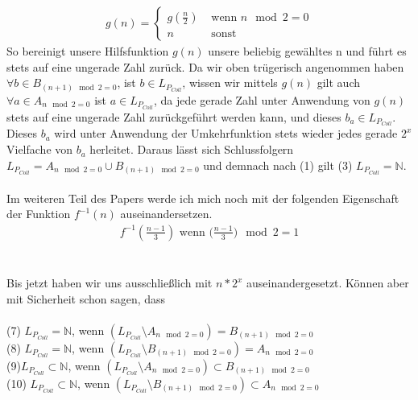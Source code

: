 \documentclass{article}
\begin{document}
\begin{gather*}
 g(n)=
\begin{cases}
g(\frac{n}{2}) & \text{ wenn } n \mod 2 = 0 \\
n & \text{ sonst }
\end{cases}  
\end{gather*}
\noindent So bereinigt unsere Hilfsfunktion $g(n)$ unsere beliebig gewähltes n und führt es stets auf eine ungerade Zahl zurück. Da wir oben trügerisch angenommen haben $\forall b \in B_{(n + 1) \mod 2 = 0}$, ist $b \in L_{P_{Coll}}$,  wissen wir mittels $g(n)$ gilt auch $\forall a \in A_{n \mod 2 = 0}$ ist $a \in L_{P_{Coll}}$, da jede gerade Zahl unter Anwendung von $g(n)$ stets auf eine ungerade Zahl zurückgeführt werden kann, und dieses $b_{a} \in L_{P_{Coll}}$. Dieses $b_{a}$ wird unter Anwendung der Umkehrfunktion stets wieder jedes gerade $2^x$ Vielfache von $b_a$ herleitet. Daraus lässt sich Schlussfolgern $L_{P_{Coll}} = A_{n \mod 2 = 0} \cup B_{(n + 1) \mod 2 = 0}$ und demnach nach (1) gilt (3) $L_{P_{Coll}} = \mathbb{N}$.\\\\
Im weiteren Teil des Papers werde ich mich noch mit der folgenden Eigenschaft der Funktion $f^{-1}(n)$ auseinandersetzen.
\begin{align*}
f^{-1}(\frac{n-1}{3}) \text{ wenn } \Big(\frac{n-1}{3}\Big) \mod 2 = 1
\end{align*}\\\\
Bis jetzt haben wir uns ausschließlich mit $n*2^{x}$ auseinandergesetzt. Können aber mit Sicherheit schon sagen, dass\\\\ 
(7) $L_{P_{Coll}} = \mathbb{N}$, wenn $(L_{P_{Coll}} \setminus A_{n \mod 2 = 0}) = B_{(n + 1) \mod 2 = 0}$\\
(8) $L_{P_{Coll}} = \mathbb{N}$, wenn $(L_{P_{Coll}} \setminus B_{(n + 1) \mod 2 = 0}) = A_{n \mod 2 = 0}$\\
(9)$L_{P_{Coll}} \subset \mathbb{N}$, wenn $(L_{P_{Coll}} \setminus A_{n \mod 2 = 0}) \subset B_{(n + 1) \mod 2 = 0}$\\
(10) $L_{P_{Coll}} \subset \mathbb{N}$, wenn $(L_{P_{Coll}} \setminus B_{(n + 1) \mod 2 = 0}) \subset A_{n \mod 2 = 0}$\\\\
\newpage
\end{document}
